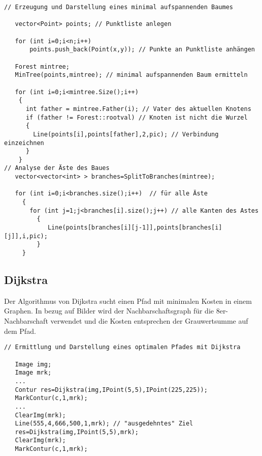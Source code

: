 \begprogr
\begin{verbatim}
// Erzeugung und Darstellung eines minimal aufspannenden Baumes 

   vector<Point> points; // Punktliste anlegen

   for (int i=0;i<n;i++)
       points.push_back(Point(x,y)); // Punkte an Punktliste anhängen

   Forest mintree;  
   MinTree(points,mintree); // minimal aufspannenden Baum ermitteln
   
   for (int i=0;i<mintree.Size();i++)
    {
      int father = mintree.Father(i); // Vater des aktuellen Knotens
      if (father != Forest::rootval) // Knoten ist nicht die Wurzel
      {
        Line(points[i],points[father],2,pic); // Verbindung einzeichnen
      }
    }
// Analyse der Äste des Baues
   vector<vector<int> > branches=SplitToBranches(mintree);

   for (int i=0;i<branches.size();i++)  // für alle Äste
     {
       for (int j=1;j<branches[i].size();j++) // alle Kanten des Astes        
         {
            Line(points[branches[i][j-1]],points[branches[i][j]],i,pic);
         }
     }

\end{verbatim}
\endprogr

\subsection{Dijkstra}
Der Algorithmus von Dijkstra sucht einen Pfad mit minimalen Kosten in 
einem Graphen. In bezug auf Bilder wird der Nachbarschaftsgraph für die
8er-Nachbarschaft verwendet und die Kosten entsprechen der Grauwertsumme 
auf dem Pfad.



\begprogr
\begin{verbatim}
// Ermittlung und Darstellung eines optimalen Pfades mit Dijkstra

   Image img;
   Image mrk;
   ...
   Contur res=Dijkstra(img,IPoint(5,5),IPoint(225,225));
   MarkContur(c,1,mrk);
   ...
   ClearImg(mrk);
   Line(555,4,666,500,1,mrk); // "ausgedehntes" Ziel
   res=Dijkstra(img,IPoint(5,5),mrk);
   ClearImg(mrk);
   MarkContur(c,1,mrk);

\end{verbatim}
\endprogr


